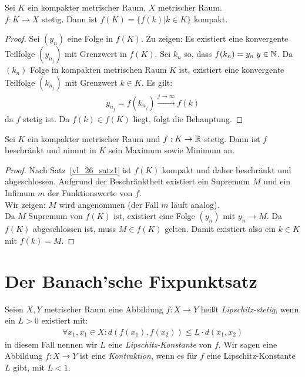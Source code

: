 \begin{Satz}\label{vl_26_satz1}%
	Sei $K$ ein kompakter metrischer Raum, $X$ metrischer Raum. \\
	$f: K \rightarrow X$ 
	stetig. Dann ist $f(K) = \{f(k)\vert k \in K\}$ kompakt.
\end{Satz}

\begin{proof}
	Sei $(y_n)$ eine Folge in $f(K)$. Zu zeigen: Es existiert eine konvergente 
	Teilfolge $(y_{n_j})$ mit Grenzwert in $f(K)$. Sei $k_n$ so, dass $f(k_n) 
	= y_n \; y \in \mathbb{N}$. Da $(k_n)$ Folge in kompakten metrischen Raum $K$ ist, 
	existiert eine konvergente Teilfolge $(k_{n_j})$ mit Grenzwert $k \in K$. Es 
	gilt: 
	\begin{align*}
		y_{n_j} = f(k_{n_j}) \xrightarrow{j \rightarrow \infty} f(k)
	\end{align*}
	da $f$ stetig ist. Da $f(k) \in f(K)$ liegt, folgt die Behauptung.
\end{proof}

\begin{Korollar}%
	Sei $K$ ein kompakter metrischer Raum und $f: K \rightarrow \mathbb{R}$ stetig. 
	Dann ist $f$ beschränkt und nimmt in $K$ sein Maximum sowie Minimum an.
\end{Korollar}

\begin{proof}
	Nach Satz~\ref{vl_26_satz1} ist $f(K)$ kompakt und daher beschränkt und 
	abgeschlossen. Aufgrund der Beschränktheit existiert ein Supremum $M$ und 
	ein Infimum $m$ der Funktionswerte von $f$. \\
	Wir zeigen: $M$ wird angenommen (der Fall $m$ läuft analog).\\
	Da $M$ Supremum von $f(K)$ ist, existiert eine Folge $(y_n)$ mit 
	$y_n \rightarrow M$. Da $f(K)$ abgeschlossen ist, muss $M \in f(K)$ gelten. 
	Damit existiert also ein $k \in K$ mit $f(k) = M$. 
\end{proof}

\cleardoublepage
\section{Der Banach'sche Fixpunktsatz}

\begin{Definition}%
	Seien $X,Y$ metrischer Raum eine Abbildung $f: X \rightarrow Y$ heißt 
	\emph{Lipschitz-stetig}, wenn ein $L > 0$ existiert mit:
	\begin{align*}
		\forall x_1, x_1 \in X: d(f(x_1),f(x_2)) \leq L \cdot d(x_1,x_2)
	\end{align*}
	in diesem Fall nennen wir $L$ eine \emph{Lipschitz-Konstante} von $f$.
	Wir sagen eine Abbildung $f: X \rightarrow Y$ ist eine \emph{Kontraktion}, 
	wenn es für $f$ eine Lipschitz-Konstante $L$ gibt, mit $L < 1$.
\end{Definition}


